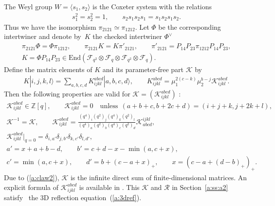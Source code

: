 \documentclass[11pt]{article}
\begin{document}
The Weyl group $W=\langle s_1, s_2 \rangle$ is the Coxeter system
with the relations
\begin{gather*}
s_1^2=s_2^2=1,\qquad
s_2s_1s_2s_1 = s_1s_2s_1s_2.
\end{gather*}
Thus we have the isomorphism
$\pi_{2121} \simeq \pi_{1212}$.
Let $\Phi$ be the corresponding intertwiner and denote by~$K$
the checked intertwiner $\Phi^\vee$
\begin{gather*}
\pi_{2121} \Phi = \Phi  \pi_{1212},\qquad
\pi_{2121} K = K  \pi'_{2121},\qquad
\pi'_{2121} = P_{14}P_{23}\pi_{1212}P_{14}P_{23},\\
K = \Phi P_{14}P_{23} \in
\mathrm{End}(\mathcal{F}_{q^2}\otimes
\mathcal{F}_{q}\otimes
\mathcal{F}_{q^2}\otimes
\mathcal{F}_{q}).
\end{gather*}
Def\/ine the matrix elements of $K$ and its parameter-free part
$\mathscr{K}$ by
\begin{gather*}
K  |i,j,k,l \rangle=
\sum_{a,b,c,d}K^{abcd}_{ijkl}|a,b,c,d \rangle,
\qquad
K^{abcd}_{ijkl}  = \mu_1^{2(c-k)}\mu_2^{b-j}
\mathscr{K}^{abcd}_{ijkl}.
\end{gather*}
Then the following properties are valid for
$\mathscr{K} = (\mathscr{K}^{abcd}_{ijkl})$ \cite{KO1}:
\begin{gather}
\mathscr{K}^{abcd}_{ijkl} \in \mathbb{Z}[q],\qquad
\mathscr{K}^{abcd}_{ijkl}=0 \quad \mathrm{unless}\ \
(a+b+c, b+2c+d)=(i+j+k, j+2k+l),
\label{a:claw2}\\
\mathscr{K}^{-1} = \mathscr{K},\qquad
\mathscr{K}^{a b c d}_{i j k l}
= \frac{(q^4)_i(q^2)_j(q^4)_k(q^2)_l }{(q^4)_a(q^2)_b(q^4)_c(q^2)_d}
\mathscr{K}^{i j k l}_{a b c d},\label{a:kprop}\\
\mathscr{K}^{abcd}_{ijkl}|_{q=0}
= \delta_{i,a'}\delta_{j,b'}\delta_{k,c'}\delta_{l,d'},\label{a:k0}\\
a'=x + a + b - d,\qquad
b'=c + d - x-\min(a,c + x),\nonumber\\
  c'=\min(a,c+x),\qquad
d'= b+(c-a+x)_+,\qquad x=(c-a+(d-b)_+)_+.\nonumber
\end{gather}
Due to (\ref{a:claw2}), $\mathscr{K}$ is the inf\/inite direct sum
of f\/inite-dimensional matrices.
An explicit formula of $\mathscr{K}^{abcd}_{ijkl}$ is available
in \cite[equations~(3.27), (3.28)]{KO1}.
This $\mathscr{K}$ and $\mathscr{R}$ in Section~\ref{a:ss:a2} satisfy~\cite{KO1}
the 3D ref\/lection equation~(\ref{a:3dref}).
\end{document}

